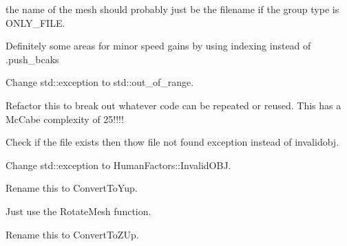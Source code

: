 
\begin{DoxyRefList}
\item[Member \mbox{\hyperlink{a00403_a06c0c11adb62f8b204e42f75ac1990ac}{HF\+::Geometry\+::Load\+Mesh\+Objects}} (std\+::string path, GROUP\+\_\+\+METHOD gm=ONLY\+\_\+\+FILE, bool change\+\_\+coords=false, int scale=1)]\label{a00386__todo000014}%
%
the name of the mesh should probably just be the filename if the group type is ONLY\+\_\+\+FILE. 



Definitely some areas for minor speed gains by using indexing instead of .push\+\_\+bcaks 



Change std\+::exception to std\+::out\+\_\+of\+\_\+range. 



Refactor this to break out whatever code can be repeated or reused. This has a Mc\+Cabe complexity of 25!!!! 
\item[Member \mbox{\hyperlink{a00403_aec1df746155d224838048d3a43c2fe96}{HF\+::Geometry\+::Load\+Raw\+Vertices}} (std\+::string path)]\label{a00386__todo000015}%
%
Check if the file exists then thow file not found exception instead of invalidobj. 
\item[Member \mbox{\hyperlink{a01285_a05d1a3ebca83e841e8902baaecc59930}{HF\+::Geometry\+::Mesh\+Info\texorpdfstring{$<$}{<} numeric\+\_\+type \texorpdfstring{$>$}{>}\+::Add\+Verts}} (const std\+::vector\texorpdfstring{$<$}{<} std\+::array$<$ numeric\+\_\+type, 3 $>$ \texorpdfstring{$>$}{>} \&verts)]\label{a00386__todo000009}%
%
Change std\+::exception to Human\+Factors\+::\+Invalid\+OBJ.  
\item[Member \mbox{\hyperlink{a01285_a5f067dbc661b07c1762b402da03f2041}{HF\+::Geometry\+::Mesh\+Info\texorpdfstring{$<$}{<} numeric\+\_\+type \texorpdfstring{$>$}{>}\+::Convert\+To\+OBJCoordinates}} ()]\label{a00386__todo000011}%
%
Rename this to Convert\+To\+Yup. 



Just use the Rotate\+Mesh function. 
\item[Member \mbox{\hyperlink{a01285_af1152233ddbd8fac736f761347e6d3b8}{HF\+::Geometry\+::Mesh\+Info\texorpdfstring{$<$}{<} numeric\+\_\+type \texorpdfstring{$>$}{>}\+::Convert\+To\+Rhino\+Coordinates}} ()]\label{a00386__todo000010}%
%
Rename this to Convert\+To\+ZUp. 




\end{DoxyRefList}
